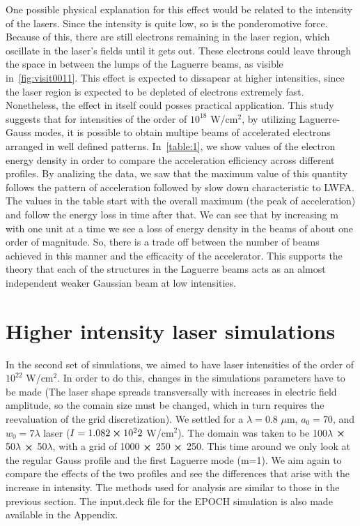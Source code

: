 \documentclass[12pt, class=report, crop=false]{standalone}
\begin{document}
One possible physical explanation for this effect would be related to the intensity of the lasers. Since the intensity is quite low, so is the ponderomotive force. Because of this, there are still electrons remaining in the laser region, which oscillate in the laser's fields until it gets out. These electrons could leave through the space in between the lumps of the Laguerre beams, as visible in~\cref{fig:visit0011}. This effect is expected to dissapear at higher intensities, since the laser region is expected to be depleted of electrons extremely fast. Nonetheless, the effect in itself could posses practical application. This study suggests that for intensities of the order of $10^18$ W/cm$^2$, by utilizing Laguerre-Gauss modes, it is possible to obtain multipe beams of accelerated electrons arranged in well defined patterns. In~\cref{table:1}, we show values of the electron energy density in order to compare the acceleration efficiency across different profiles. By analizing the data, we saw that the maximum value of this quantity follows the pattern of acceleration followed by slow down characteristic to LWFA. The values in the table start with the overall maximum (the peak of acceleration) and follow the energy loss in time after that. We can see that by increasing m with one unit at a time we see a loss of energy density in the beams of about one order of magnitude. So, there is a trade off between the number of beams achieved in this manner and the efficacity of the accelerator. This supports the theory that each of the structures in the Laguerre beams acts as an almost independent weaker Gaussian beam at low intensities.

\section{Higher intensity laser simulations}

In the second set of simulations, we aimed to have laser intensities of the order of $10^22$ W/cm$^2$. In order to do this, changes in the simulations parameters have to be made (The laser shape spreads transversally with increases in electric field amplitude, so the comain size must be changed, which in turn requires the reevaluation of the grid discretization). We settled for a \(\lambda = 0.8\) \(\mu\)m, \(a_0=70\), and \(w_0 = 7\lambda\) laser (\(I = 1.082\cp 10^22\) W/cm$^2$). The domain was taken to be 100\(\lambda\) $\cp$ 50\(\lambda\) $\cp$ 50\(\lambda\), with a grid of 1000 $\cp$ 250 $\cp$ 250. This time around we only look at the regular Gauss profile and the first Laguerre mode (m=1). We aim again to compare the effects of the two profiles and see the differences that arise with the increase in intensity. The methods used for analysis are similar to those in the previous section. The input.deck file for the EPOCH simulation is also made available in the Appendix.
\end{document}
